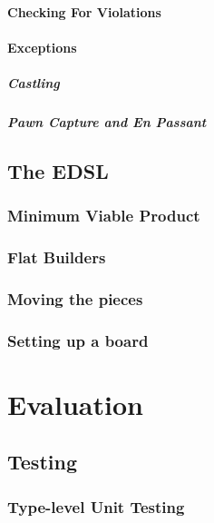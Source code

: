 \documentclass[12pt, a4paper, bibliography=totocnumbered]{scrreprt}
\begin{document}
\subsubsection{Checking For Violations}

\subsubsection{Exceptions}

\paragraph{Castling}

\paragraph{Pawn Capture and En Passant}

\section{The EDSL}

\subsection{Minimum Viable Product}

\subsection{Flat Builders}

\subsection{Moving the pieces}

\subsection{Setting up a board}


\chapter{Evaluation}

\section{Testing}

\subsection{Type-level Unit Testing}
\end{document}
